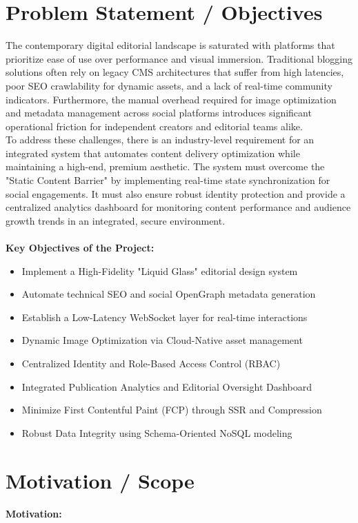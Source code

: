 \documentclass[12pt,a4paper]{report}
\begin{document}
\section{Problem Statement / Objectives}
The contemporary digital editorial landscape is saturated with platforms that prioritize ease of use over performance and visual immersion. Traditional blogging solutions often rely on legacy CMS architectures that suffer from high latencies, poor SEO crawlability for dynamic assets, and a lack of real-time community indicators. Furthermore, the manual overhead required for image optimization and metadata management across social platforms introduces significant operational friction for independent creators and editorial teams alike.
\\
To address these challenges, there is an industry-level requirement for an integrated system that automates content delivery optimization while maintaining a high-end, premium aesthetic. The system must overcome the "Static Content Barrier" by implementing real-time state synchronization for social engagements. It must also ensure robust identity protection and provide a centralized analytics dashboard for monitoring content performance and audience growth trends in an integrated, secure environment.
\\
\\
\textbf{Key Objectives of the Project:}
\begin{itemize}
    \item Implement a High-Fidelity "Liquid Glass" editorial design system
    \item Automate technical SEO and social OpenGraph metadata generation
    \item Establish a Low-Latency WebSocket layer for real-time interactions
    \item Dynamic Image Optimization via Cloud-Native asset management
    \item Centralized Identity and Role-Based Access Control (RBAC)
    \item Integrated Publication Analytics and Editorial Oversight Dashboard
    \item Minimize First Contentful Paint (FCP) through SSR and Compression
    \item Robust Data Integrity using Schema-Oriented NoSQL modeling
\end{itemize}
\newpage
\section{Motivation / Scope}
\textbf{Motivation:}
\end{document}
